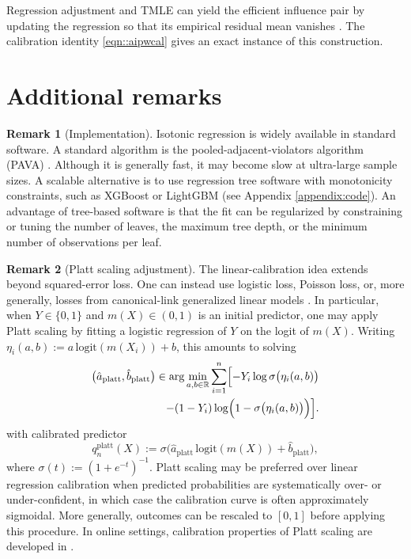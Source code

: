 \documentclass{article}
\theoremstyle{plain}
\theoremstyle{definition}
\newtheorem{remark}{Remark}
\newcommand{\R}{\mathbb{R}}
\newcommand{\1}{\mathbf{1}}
\newcommand{\mhat}{m}
\begin{document}
Regression adjustment and TMLE can yield the efficient influence pair by
updating the regression so that its empirical residual mean vanishes
\citep{scharfstein1999adjusting,van2006targeted,rosenblum2009using}.
The calibration identity \eqref{eqn::aipwcal} gives an exact instance of this construction.

\section{Additional remarks}

\label{appendix:remarks}

\begin{remark}[Implementation]
Isotonic regression is widely available in standard software. A standard algorithm is the pooled-adjacent-violators algorithm (PAVA) \citep{barlow1972isotonic}. Although it is generally fast, it may become slow at ultra-large sample sizes. A scalable alternative is to use regression tree software with monotonicity constraints, such as XGBoost or LightGBM (see Appendix \ref{appendix:code}). An advantage of tree-based software is that the fit can be regularized by constraining or tuning the number of leaves, the maximum tree depth, or the minimum number of observations per leaf.
\end{remark}

\begin{remark}[Platt scaling adjustment]
The linear-calibration idea extends beyond squared-error loss. One can instead use logistic loss, Poisson loss, or, more generally, losses from canonical-link generalized linear models \citep{rosenblum2009using}. In particular, when \(Y\in\{0,1\}\) and \(\mhat(X)\in(0,1)\) is an initial predictor, one may apply Platt scaling \citep{cox1958two,platt1999probabilistic} by fitting a logistic regression of \(Y\) on the logit of \(\mhat(X)\). Writing \(\eta_i(a,b):=a\,\mathrm{logit}(\mhat(X_i))+b\), this amounts to solving
\begin{equation}
\label{eq:platt-cal}
\begin{split}
\bigl(\hat a_{\mathrm{platt}},\hat b_{\mathrm{platt}}\bigr)
\in
\arg\min_{a,b\in\R}
\sum_{i=1}^n
\Bigl[
 -Y_i \log \sigma\bigl(\eta_i(a,b)\bigr) \\
 \qquad\qquad
 -(1-Y_i)\log\Bigl(1-\sigma\bigl(\eta_i(a,b)\bigr)\Bigr)
\Bigr].
\end{split}
\end{equation}
with calibrated predictor
\[
q_n^{\mathrm{platt}}(X)
:=
\sigma\bigl(\hat a_{\mathrm{platt}}\,\mathrm{logit}(\mhat(X))+\hat b_{\mathrm{platt}}\bigr),
\]
where \(\sigma(t):=(1+e^{-t})^{-1}\). Platt scaling may be preferred over linear regression calibration when predicted probabilities are systematically over- or under-confident, in which case the calibration curve is often approximately sigmoidal. More generally, outcomes can be rescaled to \([0,1]\) before applying this procedure. In online settings, calibration properties of Platt scaling are developed in \cite{gupta2023online}.
\end{remark}
\end{document}
